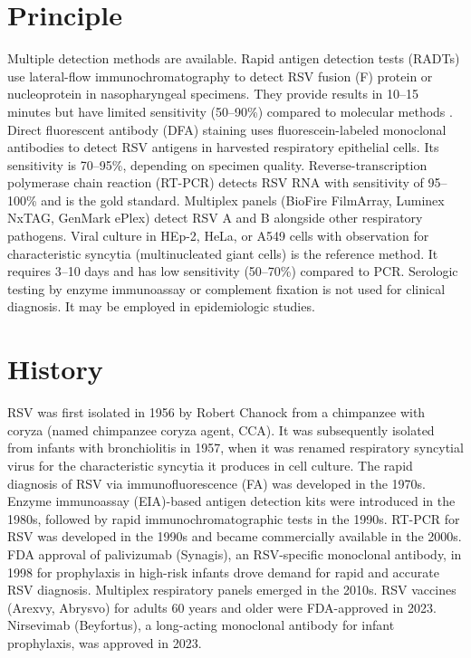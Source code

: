 \section*{Principle}
Multiple detection methods are available. Rapid antigen detection tests (RADTs) use lateral-flow immunochromatography to detect RSV fusion (F) protein or nucleoprotein in nasopharyngeal specimens. They provide results in 10--15 minutes but have limited sensitivity (50--90\%) compared to molecular methods \cite{chartrand2015diagnostic}. Direct fluorescent antibody (DFA) staining uses fluorescein-labeled monoclonal antibodies to detect RSV antigens in harvested respiratory epithelial cells. Its sensitivity is 70--95\%, depending on specimen quality. Reverse-transcription polymerase chain reaction (RT-PCR) detects RSV RNA with sensitivity of 95--100\% and is the gold standard. Multiplex panels (BioFire FilmArray, Luminex NxTAG, GenMark ePlex) detect RSV A and B alongside other respiratory pathogens. Viral culture in HEp-2, HeLa, or A549 cells with observation for characteristic syncytia (multinucleated giant cells) is the reference method. It requires 3--10 days and has low sensitivity (50--70\%) compared to PCR. Serologic testing by enzyme immunoassay or complement fixation is not used for clinical diagnosis. It may be employed in epidemiologic studies.

\section*{History}
RSV was first isolated in 1956 by Robert Chanock from a chimpanzee with coryza (named chimpanzee coryza agent, CCA). It was subsequently isolated from infants with bronchiolitis in 1957, when it was renamed respiratory syncytial virus for the characteristic syncytia it produces in cell culture. The rapid diagnosis of RSV via immunofluorescence (FA) was developed in the 1970s. Enzyme immunoassay (EIA)-based antigen detection kits were introduced in the 1980s, followed by rapid immunochromatographic tests in the 1990s. RT-PCR for RSV was developed in the 1990s and became commercially available in the 2000s. FDA approval of palivizumab (Synagis), an RSV-specific monoclonal antibody, in 1998 for prophylaxis in high-risk infants drove demand for rapid and accurate RSV diagnosis. Multiplex respiratory panels emerged in the 2010s. RSV vaccines (Arexvy, Abrysvo) for adults 60 years and older were FDA-approved in 2023. Nirsevimab (Beyfortus), a long-acting monoclonal antibody for infant prophylaxis, was approved in 2023.

